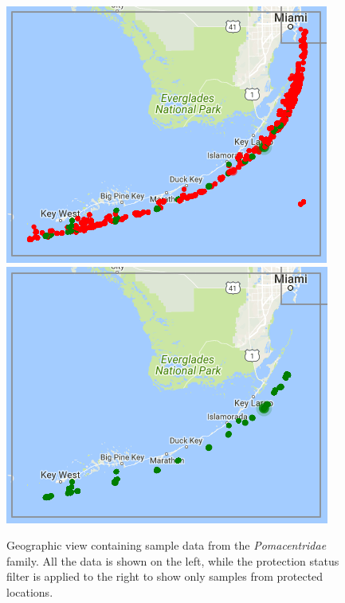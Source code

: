 \documentclass[letterpaper]{article} %
\begin{document}

\begin{figure}
  \centering
  \includegraphics[width=.49\columnwidth]{./figs/geo_pomacentridae.png}
  \includegraphics[width=.49\columnwidth]{./figs/geo_pomacentridae_prot.png}
  \caption{Geographic view containing sample data from the \emph{Pomacentridae}
  family.  All the data is shown on the left, while the protection status
filter is applied to the right to show only samples from protected locations.}
  \label{fig:geo_data}
\end{figure}
\end{document}

